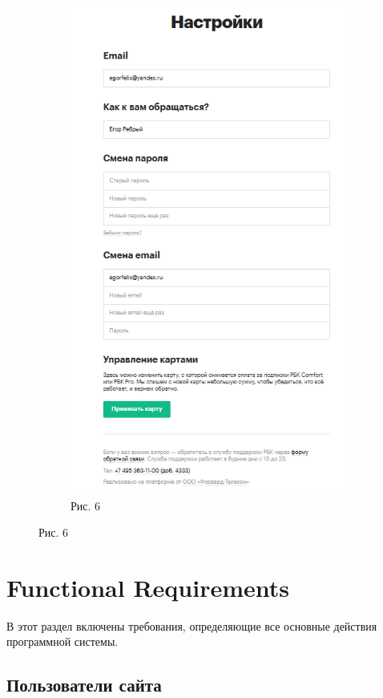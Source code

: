\documentclass{scrreprt}
\begin{document}
\begin{figure}[ht]
\begin{subfigure}[b]{0.3\textwidth}
 		\includegraphics[width=\textwidth]{f}
 		\caption{Рис. 6}
 	\end{subfigure}
 \end{figure}
 \newpage
\section{Functional Requirements}
В этот раздел включены требования, определяющие все основные действия программной системы.
\subsection{Пользователи сайта}
\end{document}

